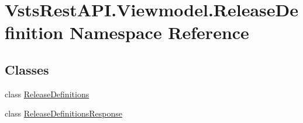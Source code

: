 \hypertarget{namespace_vsts_rest_a_p_i_1_1_viewmodel_1_1_release_definition}{}\section{Vsts\+Rest\+A\+P\+I.\+Viewmodel.\+Release\+Definition Namespace Reference}
\label{namespace_vsts_rest_a_p_i_1_1_viewmodel_1_1_release_definition}
\subsection*{Classes}
\begin{DoxyCompactItemize}
\item 
class \mbox{\hyperlink{class_vsts_rest_a_p_i_1_1_viewmodel_1_1_release_definition_1_1_release_definitions}{Release\+Definitions}}
\item 
class \mbox{\hyperlink{class_vsts_rest_a_p_i_1_1_viewmodel_1_1_release_definition_1_1_release_definitions_response}{Release\+Definitions\+Response}}
\end{DoxyCompactItemize}
